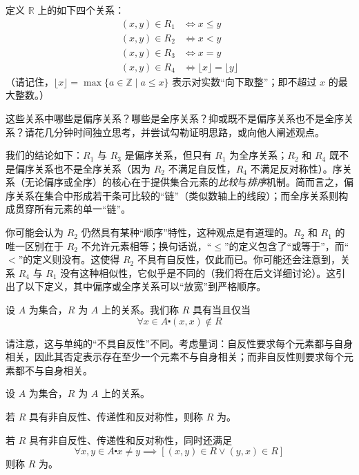 \begin{example} \label{ex:example6.3.3}
    定义 $\mathbb{R}$ 上的如下四个关系：
    \begin{align*}
        (x, y) \in R_1 &\iff x \le y \\
        (x, y) \in R_2 &\iff x < y \\
        (x, y) \in R_3 &\iff x = y \\
        (x, y) \in R_4 &\iff \lfloor x \rfloor = \lfloor y \rfloor
    \end{align*}
    （请记住，$\lfloor x \rfloor = \max\{a \in \mathbb{Z} \mid a \le x\}$ 表示对实数``向下取整''；即不超过 $x$ 的最大整数。）

    这些关系中哪些是偏序关系？哪些是全序关系？抑或既不是偏序关系也不是全序关系？请花几分钟时间独立思考，并尝试勾勒证明思路，或向他人阐述观点。

    我们的结论如下：$R_1$ 与 $R_3$ 是偏序关系，但只有 $R_1$ 为全序关系；$R_2$ 和 $R_4$ 既不是偏序关系也不是全序关系（因为 $R_2$ 不满足自反性，$R_4$ 不满足反对称性）。序关系（无论偏序或全序）的核心在于提供集合元素的\emph{比较}与\emph{排序}机制。简而言之，偏序关系在集合中形成若干条可比较的``链''（类似数轴上的线段）；而全序关系则构成贯穿所有元素的单一``链''。
\end{example}

你可能会认为 $R_2$ 仍然具有某种``顺序''特性，这种观点是有道理的。$R_2$ 和 $R_1$ 的唯一区别在于 $R_2$ 不允许元素相等；换句话说，``$\le$''的定义包含了``或等于''，而``$<$''的定义则没有。这使得 $R_2$ 不具有自反性，仅此而已。你可能还会注意到，关系 $R_4$ 与 $R_1$ 没有这种相似性，它似乎是不同的（我们将在后文详细讨论）。这引出了以下定义，其中偏序或全序关系可以``放宽''到严格顺序。

\begin{definition}
    设 $A$ 为集合，$R$ 为 $A$ 上的关系。我们称 $R$ 具有当且仅当
    \[\forall x \in A \centerdot (x, x) \notin R\]
\end{definition}

请注意，这与单纯的``不具自反性''不同。考虑量词：自反性要求每个元素都与自身相关，因此其否定表示存在至少一个元素不与自身相关；而非自反性则要求每个元素都不与自身相关。

\begin{definition}
    设 $A$ 为集合，$R$ 为 $A$ 上的关系。
    
    若 $R$ 具有非自反性、传递性和反对称性，则称 $R$ 为。

    若 $R$ 具有非自反性、传递性和反对称性，同时还满足
    \[\forall x, y \in A \centerdot x \ne y \implies [(x, y) \in R \lor (y, x) \in R]\]
    则称 $R$ 为。
\end{definition}

